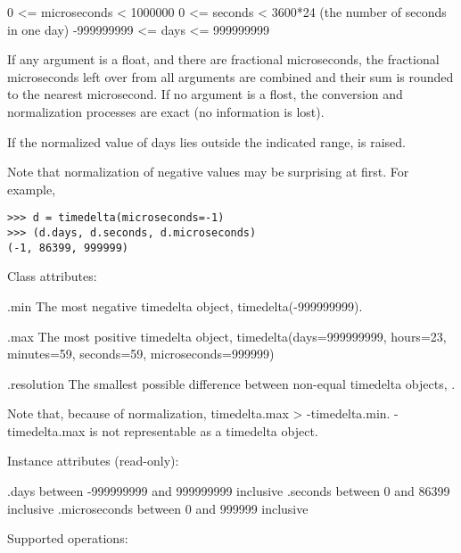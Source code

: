         0 <= microseconds < 1000000
        0 <= seconds < 3600*24 (the number of seconds in one day)
        -999999999 <= days <= 999999999

    If any argument is a float, and there are fractional microseconds,
    the fractional microseconds left over from all arguments are combined
    and their sum is rounded to the nearest microsecond.  If no
    argument is a flost, the conversion and normalization processes
    are exact (no information is lost).

    If the normalized value of days lies outside the indicated range,
     is raised.

    Note that normalization of negative values may be surprising at first.
    For example,

\begin{verbatim}
>>> d = timedelta(microseconds=-1)
>>> (d.days, d.seconds, d.microseconds)
(-1, 86399, 999999)
\end{verbatim}


Class attributes:

    .min
        The most negative timedelta object, timedelta(-999999999).

    .max
        The most positive timedelta object,
        timedelta(days=999999999, hours=23, minutes=59, seconds=59,
                  microseconds=999999)

    .resolution
        The smallest possible difference between non-equal timedelta
        objects, .

    Note that, because of normalization, timedelta.max > -timedelta.min.
    -timedelta.max is not representable as a timedelta object.

Instance attributes (read-only):

    .days           between -999999999 and 999999999 inclusive
    .seconds        between 0 and 86399 inclusive
    .microseconds   between 0 and 999999 inclusive

Supported operations:

